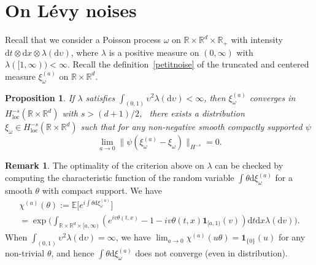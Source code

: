 \documentclass[10pt]{amsart}
\newtheorem{proposition}[theorem]{Proposition}
\theoremstyle{definition}
\newtheorem{rem}[theorem]{Remark}
\newcommand{\dd}{\mathrm{d}}
\newcommand{\ind}{\mathbf{1}}
\newcommand{\bbE}{{\ensuremath{\mathbb E}} }
\newcommand{\bbR}{{\ensuremath{\mathbb R}} }
\let\gl\lambda
\let\ups\upsilon
\let\go\omega
\begin{document}
\appendix

\section{On Lévy noises}

Recall that we consider a Poisson process $\go$ on $\bbR\times \bbR^d \times \bbR_+$ with intensity
\hbox{$\dd t \otimes \dd x \otimes \gl(\dd \ups)$},
where $\gl$ is a positive measure on $(0,\infty)$ with $\lambda([1,\infty))<\infty$.
Recall the definition~\eqref{petitnoise} of the truncated and centered measure $\xi_{\go}^{(a)}$ on $\bbR\times \bbR^d$.

\begin{proposition}\label{convergence2}
If $\gl$ satisfies
$\int_{(0,1)} \ups^2 \gl(\dd \ups)<\infty$,
then $\xi^{(a)}_{\go}$ converges in \hbox{$H^{-s}_{\mathrm{loc}}(\bbR\times \bbR^d)$} with $s>(d+1)/2$, \ie \ there exists a distribution $\xi_{\go} \in H^{-s}_{\mathrm{loc}}(\bbR\times \bbR^d)$ such that
for any non-negative smooth compactly supported $\psi$
\begin{equation}
\lim_{a\to 0} \| \psi(\xi_{\go}^{(a)}-\xi_{\go}) \|_{H^{-s}}=0.
\end{equation}
\end{proposition}

\begin{rem}
\label{rem:noiseL2}
The optimality of the criterion above on $\gl$ can be checked by computing the characteristic function of the random variable $\int \theta \dd \xi_{\go}^{(a)}$ for a smooth $\theta$ with compact support. We have
\begin{multline*}
\chi^{(a)}(\theta):=\bbE\bigl[ e^{i \int \theta \dd \xi_{\go}^{(a)}} \bigr] \\
=\exp\biggl(\int_{ \bbR\times \bbR^d \times [a,\infty)} \left(e^{i v \theta(t,x)}-1-iv\theta(t,x)\ind_{[a,1)}(v)\right) \dd t \dd x \gl(\dd v)\biggr).
\end{multline*}
When $\int_{(0,1)} \ups^2 \gl(\dd \ups)=\infty$, we have $\lim_{a\to 0} \chi^{(a)}(u\theta)=\ind_{\{0\}}(u)$ for any non-trivial $\theta$, and hence $\int \theta \dd \xi_{\go}^{(a)}$ does not converge (even in distribution).
\end{rem}
\end{document}
